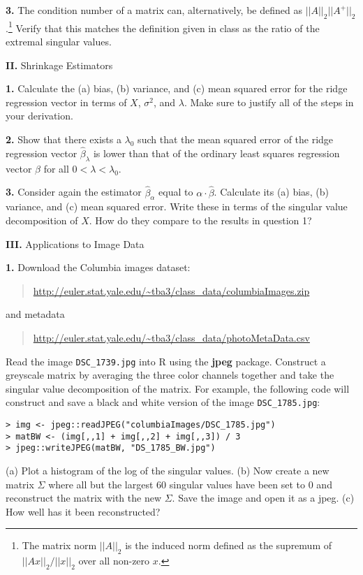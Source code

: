 \documentclass[12pt]{article}
\begin{document}
{\bf 3.} The condition number of a matrix can, alternatively, be defined as
$|| A ||_2 || A^{+} ||_2$.\footnote{The matrix norm $||A||_2$ is the induced
norm defined as the supremum  of $||Ax||_2 / ||x||_2$ over all non-zero $x$.}
Verify that this matches the definition given in class as the
ratio of the extremal singular values.

{\bf II.} Shrinkage Estimators

{\bf 1.} Calculate the (a) bias, (b) variance, and (c) mean squared error for the ridge
regression vector in terms of $X$, $\sigma^2$, and $\lambda$. Make sure to justify all
of the steps in your derivation.

{\bf 2.} Show that there exists a $\lambda_0$ such that the mean squared error of the
ridge regression vector $\widehat{\beta}_\lambda$ is lower than that of the ordinary least squares
regression vector $\widehat{\beta}$ for all $0 < \lambda < \lambda_0$.

{\bf 3.} Consider again the estimator $\widehat{\beta}_\alpha$ equal to $\alpha \cdot \widehat{\beta}$.
Calculate its (a) bias, (b) variance, and (c) mean squared error. Write these in terms of the
singular value decomposition of $X$. How do they compare to the results in question 1?

{\bf III.} Applications to Image Data

{\bf 1.} Download the Columbia images dataset:
\begin{quote}
\url{http://euler.stat.yale.edu/~tba3/class_data/columbiaImages.zip}
\end{quote}
and metadata
\begin{quote}
\url{http://euler.stat.yale.edu/~tba3/class_data/photoMetaData.csv}
\end{quote}
Read the image \texttt{DSC\_1739.jpg} into R using
the \textbf{jpeg} package. Construct a greyscale matrix by averaging the three color
channels together and take the singular value decomposition of the matrix. For example,
the following code will construct and save a black and white version of the
image \texttt{DSC\_1785.jpg}:
\begin{verbatim}
> img <- jpeg::readJPEG("columbiaImages/DSC_1785.jpg")
> matBW <- (img[,,1] + img[,,2] + img[,,3]) / 3
> jpeg::writeJPEG(matBW, "DS_1785_BW.jpg")
\end{verbatim}
(a) Plot a histogram of the log of the
singular values. (b) Now create a new matrix $\Sigma$ where all but the largest $60$ singular values
have been set to $0$ and reconstruct the matrix with the new $\Sigma$. Save the image and open it
as a jpeg. (c) How well has it been reconstructed?
\end{document}
